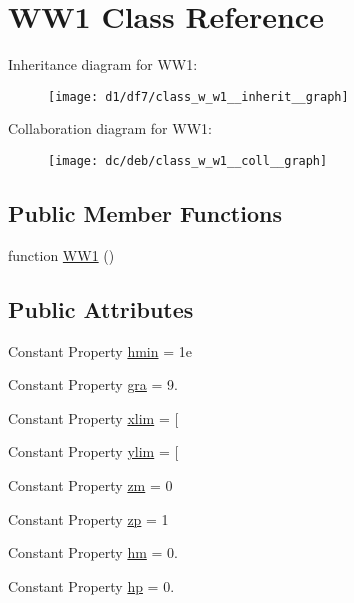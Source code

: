 \hypertarget{class_w_w1}{}\section{W\+W1 Class Reference}
\label{class_w_w1}


Inheritance diagram for W\+W1\+:
\nopagebreak
\begin{figure}[H]
\begin{center}
\leavevmode
\texttt{[image: d1/df7/class\_w\_w1\_\_inherit\_\_graph]}
\end{center}
\end{figure}


Collaboration diagram for W\+W1\+:
\nopagebreak
\begin{figure}[H]
\begin{center}
\leavevmode
\texttt{[image: dc/deb/class\_w\_w1\_\_coll\_\_graph]}
\end{center}
\end{figure}
\subsection*{Public Member Functions}
\begin{DoxyCompactItemize}
\item 
function \hyperlink{class_w_w1_af74c0c61a425a0170a3162918f5a186a}{W\+W1} ()
\end{DoxyCompactItemize}
\subsection*{Public Attributes}
\begin{DoxyCompactItemize}
\item 
Constant Property \hyperlink{class_w_w1_a8c6d9b344d8e83bbc60ce820168d28ac}{hmin} = 1e
\item 
Constant Property \hyperlink{class_w_w1_a767c45830543371bcdfcc73b98e81a81}{gra} = 9.
\item 
Constant Property \hyperlink{class_w_w1_ad5168da0d150a664f9acd0c454a62396}{xlim} = \mbox{[}
\item 
Constant Property \hyperlink{class_w_w1_a230be31b36e422b6b9563f92eed9ed12}{ylim} = \mbox{[}
\item 
Constant Property \hyperlink{class_w_w1_af734ed004bfd8d879b0869537de2909e}{zm} = 0
\item 
Constant Property \hyperlink{class_w_w1_af5eef7169f855e8397c32515243d4d61}{zp} = 1
\item 
Constant Property \hyperlink{class_w_w1_a40f59e6fdecc9008f6ccd6e9565364ef}{hm} = 0.
\item 
Constant Property \hyperlink{class_w_w1_a8c584cf4ae74405204fa3e9dfb0d3e9f}{hp} = 0.
\end{DoxyCompactItemize}
